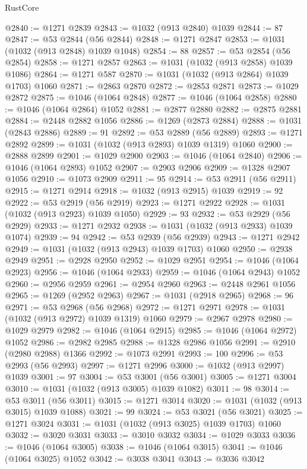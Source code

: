 \begin{lexlean}{RustCore}
\begin{coremodule}
@2840 := @1271 @2839
@2843 := @1032 (@913 @2840) @1039
@2844 := 87
@2847 := @53 @2844 (@56 @2844)
@2848 := @1271 @2847
@2853 := @1031 (@1032 (@913 @2848) @1039 @1048)
@2854 := 88
@2857 := @53 @2854 (@56 @2854)
@2858 := @1271 @2857
@2863 := @1031 (@1032 (@913 @2858) @1039 @1086)
@2864 := @1271 @587
@2870 := @1031 (@1032 (@913 @2864) @1039 @1703) @1060
@2871 := @2863 @2870
@2872 := @2853 @2871
@2873 := @1029 @2872
@2875 := @1046 (@1064 @2848)
@2877 := @1046 (@1064 @2858)
@2880 := @1046 (@1064 @2864) @1052
@2881 := @2877 @2880
@2882 := @2875 @2881
@2884 := @2448 @2882 @1056
@2886 := @1269 (@2873 @2884)
@2888 := @1031 (@2843 @2886)
@2889 := 91
@2892 := @53 @2889 (@56 @2889)
@2893 := @1271 @2892
@2899 := @1031 (@1032 (@913 @2893) @1039 @1319) @1060
@2900 := @2888 @2899
@2901 := @1029 @2900
@2903 := @1046 (@1064 @2840)
@2906 := @1046 (@1064 @2893) @1052
@2907 := @2903 @2906
@2909 := @1328 @2907 @1056
@2910 := @1073 @2909
@2911 := 95
@2914 := @53 @2911 (@56 @2911)
@2915 := @1271 @2914
@2918 := @1032 (@913 @2915) @1039
@2919 := 92
@2922 := @53 @2919 (@56 @2919)
@2923 := @1271 @2922
@2928 := @1031 (@1032 (@913 @2923) @1039 @1050)
@2929 := 93
@2932 := @53 @2929 (@56 @2929)
@2933 := @1271 @2932
@2938 := @1031 (@1032 (@913 @2933) @1039 @1074)
@2939 := 94
@2942 := @53 @2939 (@56 @2939)
@2943 := @1271 @2942
@2949 := @1031 (@1032 (@913 @2943) @1039 @1703) @1060
@2950 := @2938 @2949
@2951 := @2928 @2950
@2952 := @1029 @2951
@2954 := @1046 (@1064 @2923)
@2956 := @1046 (@1064 @2933)
@2959 := @1046 (@1064 @2943) @1052
@2960 := @2956 @2959
@2961 := @2954 @2960
@2963 := @2448 @2961 @1056
@2965 := @1269 (@2952 @2963)
@2967 := @1031 (@2918 @2965)
@2968 := 96
@2971 := @53 @2968 (@56 @2968)
@2972 := @1271 @2971
@2978 := @1031 (@1032 (@913 @2972) @1039 @1319) @1060
@2979 := @2967 @2978
@2980 := @1029 @2979
@2982 := @1046 (@1064 @2915)
@2985 := @1046 (@1064 @2972) @1052
@2986 := @2982 @2985
@2988 := @1328 @2986 @1056
@2991 := @2910 (@2980 @2988) @1366
@2992 := @1073 @2991
@2993 := 100
@2996 := @53 @2993 (@56 @2993)
@2997 := @1271 @2996
@3000 := @1032 (@913 @2997) @1039
@3001 := 97
@3004 := @53 @3001 (@56 @3001)
@3005 := @1271 @3004
@3010 := @1031 (@1032 (@913 @3005) @1039 @1082)
@3011 := 98
@3014 := @53 @3011 (@56 @3011)
@3015 := @1271 @3014
@3020 := @1031 (@1032 (@913 @3015) @1039 @1088)
@3021 := 99
@3024 := @53 @3021 (@56 @3021)
@3025 := @1271 @3024
@3031 := @1031 (@1032 (@913 @3025) @1039 @1703) @1060
@3032 := @3020 @3031
@3033 := @3010 @3032
@3034 := @1029 @3033
@3036 := @1046 (@1064 @3005)
@3038 := @1046 (@1064 @3015)
@3041 := @1046 (@1064 @3025) @1052
@3042 := @3038 @3041
@3043 := @3036 @3042

\end{coremodule}
\end{lexlean}
